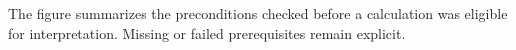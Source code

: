 The figure summarizes the preconditions checked before a calculation was eligible for interpretation. Missing or failed prerequisites remain explicit.
